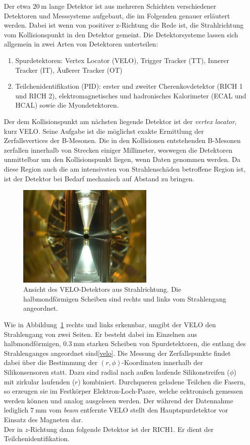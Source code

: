 %
Der etwa $\SI{20}{\meter}$ lange Detektor ist aus mehreren Schichten verschiedener Detektoren und Messsysteme aufgebaut, die im Folgenden genauer erläutert werden. Dabei ist wenn von positiver z-Richtung die Rede ist, die Strahlrichtung vom Kollisionspunkt in den Detektor gemeint. Die Detektorsysteme lassen sich allgemein in zwei Arten von Detektoren unterteilen:
%
\begin{enumerate}
  \item Spurdetektoren: Vertex Locator (VELO), Trigger Tracker (TT), Innerer Tracker (IT), Äußerer Tracker (OT)
  \item Teilchenidentifikation (PID): erster und zweiter Cherenkovdetektor (RICH 1 und RICH 2), elektromagnetisches und hadronisches Kalorimeter (ECAL und HCAL) sowie die Myondetektoren.
\end{enumerate}
%
Der dem Kollisionspunkt am nächsten liegende Detektor ist der \textit{vertex locator}, kurz VELO. Seine Aufgabe ist die möglichst exakte Ermittlung der Zerfallsvertices der B-Mesonen. Die in den Kollisionen entstehenden B-Mesonen zerfallen innerhalb von Strecken einiger Millimeter, weswegen die Detektoren unmittelbar um den Kollisionspunkt liegen, wenn Daten genommen werden\cite{velo}. Da diese Region auch die am intensivsten von Strahlenschäden betroffene Region ist, ist der Detektor bei Bedarf mechanisch auf Abstand zu bringen.
%
\begin{figure}[H]
  \centering
      \includegraphics[width=0.6\textwidth]{Plots/VELO-beam-view.jpg}
  \caption{Ansicht des VELO-Detektors aus Strahlrichtung. Die halbmondförmigen Scheiben sind rechts und links vom Strahlengang angeordnet\cite{velo}.}
  \label{fig:velo}
\end{figure}
%
Wie in Abbildung~\ref{fig:velo} rechts und links erkennbar, umgibt der VELO den Strahlengang von zwei Seiten. Er besteht dabei im Einzelnen aus halbmondförmigen, $\SI{0.3}{\milli\meter}$ starken Scheiben von Spurdetektoren, die entlang des Strahlenganges angeordnet sind\ref{velo}. Die Messung der Zerfallspunkte findet dabei über die Bestimmung der $(r, \phi)$-Koordinaten innerhalb der Silikonsensoren statt. Dazu sind radial nach außen laufende Silikonstreifen ($\phi$) mit zirkular laufenden ($r$) kombiniert\cite{lhcb}. Durchqueren geladene Teilchen die Fasern, so erzeugen sie im Festkörper Elektron-Loch-Paare, welche eektronisch gemessen werden können und analog ausgelesen werden. Der während der Datennahme lediglich $\SI{7}{\milli\meter}$ vom \textit{beam} entfernte VELO stellt den Hauptspurdetektor vor Einsatz des Magneten dar\cite{velo}. \\
%
Der in $z$-Richtung dann folgende Detektor ist der RICH1. Er dient der Teilchenidentifikation.
